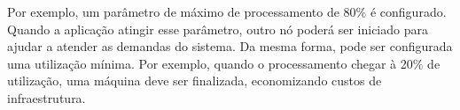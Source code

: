 Por exemplo, um parâmetro de máximo de processamento de 80\% é configurado.
Quando a aplicação atingir esse parâmetro, outro nó poderá ser iniciado para ajudar
a atender as demandas do sistema. Da mesma forma, pode ser configurada uma utilização
mínima. Por exemplo, quando o processamento chegar à 20\% de utilização, uma máquina
deve ser finalizada, economizando custos de infraestrutura.






%
%
%

%

